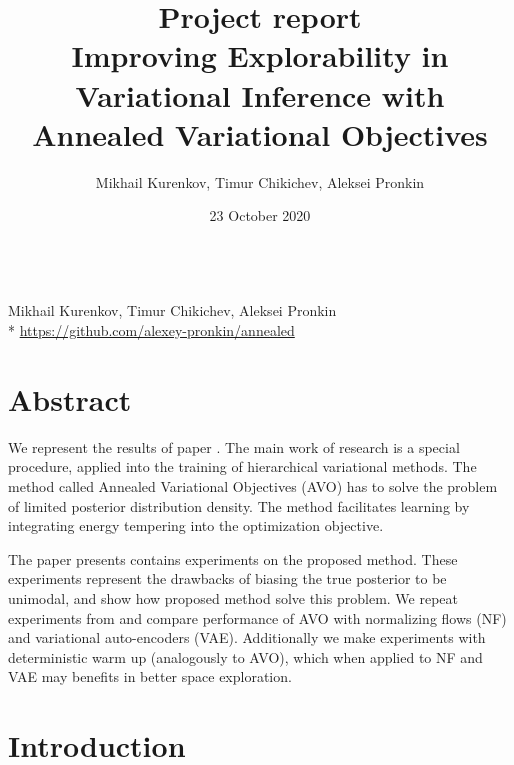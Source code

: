\documentclass{article}
\title{Project report \\ Improving Explorability in Variational Inference with Annealed Variational Objectives}
\author{Mikhail Kurenkov, Timur Chikichev, Aleksei Pronkin}
\date{23 October 2020}
\begin{document}
\vspace*{0.35in}

\begin{flushleft}
{\Large
\textbf{}
}
\newline
\\
{Mikhail Kurenkov,
Timur Chikichev,
Aleksei Pronkin}
\\
\bigskip
* \url{https://github.com/alexey-pronkin/annealed}

\end{flushleft}

\section*{Abstract}

We represent the results of paper \cite{main_Huang2018ImprovingEI}.
The main work of research is a special procedure, applied into the training of hierarchical variational methods. The method called Annealed Variational Objectives (AVO) has to solve the problem of limited posterior distribution density. The method facilitates learning by integrating energy tempering into the optimization objective.

The paper presents contains experiments on the proposed method. These experiments represent the drawbacks of biasing the true posterior to be unimodal, and show how proposed method solve this problem.
We repeat experiments from \cite{main_Huang2018ImprovingEI} and compare performance of AVO with normalizing flows (NF) and variational auto-encoders (VAE). Additionally we make experiments with deterministic warm up (analogously to AVO), which when applied to NF and VAE may benefits in better space exploration.


\section{Introduction}

\end{document}
